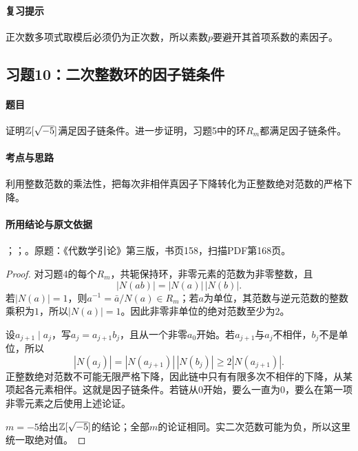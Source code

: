 \paragraph{复习提示}

正次数多项式取模后必须仍为正次数，所以素数$p$要避开其首项系数的素因子。

\subsection{习题10：二次整数环的因子链条件}

\label{ex:4:10}

\paragraph{题目}

证明$\mathbb Z[\sqrt{-5}]$满足因子链条件。进一步证明，习题5中的环$R_m$都满足因子链条件。

\paragraph{考点与思路}

利用整数范数的乘法性，把每次非相伴真因子下降转化为正整数绝对范数的严格下降。

\paragraph{所用结论与原文依据}

；；。原题：《代数学引论》第三版，书页158，扫描PDF第168页。


\begin{proof}

对习题4的每个$R_m$，共轭保持环，非零元素的范数为非零整数，且
\[
|N(ab)|=|N(a)|\,|N(b)|.
\]
若$|N(a)|=1$，则$a^{-1}=\bar a/N(a)\in R_m$；若$a$为单位，其范数与逆元范数的整数乘积为$1$，所以$|N(a)|=1$。因此非零非单位的绝对范数至少为$2$。

设$a_{j+1}\mid a_j$，写$a_j=a_{j+1}b_j$，且从一个非零$a_0$开始。若$a_{j+1}$与$a_j$不相伴，$b_j$不是单位，所以
\[
|N(a_j)|=|N(a_{j+1})|\,|N(b_j)|\ge2|N(a_{j+1})|.
\]
正整数绝对范数不可能无限严格下降，因此链中只有有限多次不相伴的下降，从某项起各元素相伴。这就是因子链条件。若链从$0$开始，要么一直为$0$，要么在第一项非零元素之后使用上述论证。

$m=-5$给出$\mathbb Z[\sqrt{-5}]$的结论；全部$m$的论证相同。实二次范数可能为负，所以这里统一取绝对值。

\end{proof}

